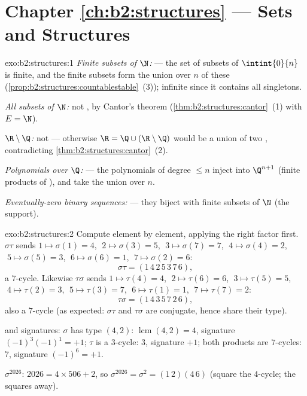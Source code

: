 \section*{Chapter \ref{ch:b2:structures} --- Sets and Structures}

\begin{solution}{exo:b2:structures:1}
\emph{Finite subsets of $\N$:}  --- the set of subsets of
$\intint{0}{n}$ is finite, and the finite subsets form the 
union over $n$ of these
(\cref{prop:b2:structures:countablestable}~(3)); infinite since it
contains all singletons.

\emph{All subsets of $\N$:} not , by Cantor's theorem
(\cref{thm:b2:structures:cantor}~(1) with $E = \N$).

\emph{$\R \setminus \Q$:} not  --- otherwise $\R = \Q \cup
(\R\setminus\Q)$ would be a union of two ,
contradicting \cref{thm:b2:structures:cantor}~(2).

\emph{Polynomials over $\Q$:}  --- the polynomials of degree
$\leq n$ inject into $\Q^{n+1}$ (finite products of ),
and take the union over $n$.

\emph{Eventually-zero binary sequences:}  --- they biject with
finite subsets of $\N$ (the support).
\end{solution}

\begin{solution}{exo:b2:structures:2}
Compute element by element, applying the right factor first.
$\sigma\tau$ sends $1 \mapsto \sigma(1) = 4$, $\;2 \mapsto \sigma(3)
= 5$, $\;3 \mapsto \sigma(7) = 7$, $\;4 \mapsto \sigma(4) = 2$, $\;5
\mapsto \sigma(5) = 3$, $\;6 \mapsto \sigma(6) = 1$, $\;7 \mapsto
\sigma(2) = 6$:
\[
\sigma\tau = (1\,4\,2\,5\,3\,7\,6),
\]
a $7$-cycle. Likewise $\tau\sigma$ sends $1 \mapsto \tau(4) = 4$,
$\;2 \mapsto \tau(6) = 6$, $\;3 \mapsto \tau(5) = 5$, $\;4 \mapsto
\tau(2) = 3$, $\;5 \mapsto \tau(3) = 7$, $\;6 \mapsto \tau(1) = 1$,
$\;7 \mapsto \tau(7) = 2$:
\[
\tau\sigma = (1\,4\,3\,5\,7\,2\,6),
\]
also a $7$-cycle (as expected: $\sigma\tau$ and $\tau\sigma$ are
conjugate, hence share their  type).

 and signatures: $\sigma$ has  type $(4,2)$: 
$\operatorname{lcm}(4,2) = 4$, signature $(-1)^3(-1)^1 = +1$; $\tau$
is a $3$-cycle:  $3$, signature $+1$; both products are
$7$-cycles:  $7$, signature $(-1)^6 = +1$.

$\sigma^{2026}$: $2026 = 4 \times 506 + 2$, so $\sigma^{2026} =
\sigma^2 = (1\,2)(4\,6)$ (square the $4$-cycle; the 
squares away).
\end{solution}

